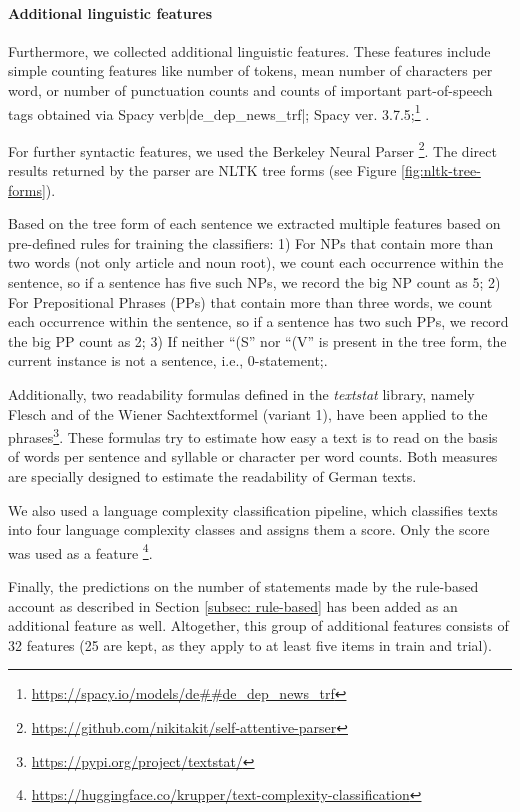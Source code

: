 \documentclass[11pt]{article}
\begin{document}
\paragraph{Additional linguistic features}

Furthermore, we collected additional linguistic features. These features include simple counting features like number of tokens, mean number of characters per word, or number of punctuation counts and counts of important part-of-speech tags obtained via Spacy verb|de\_dep\_news\_trf|; Spacy ver. 3.7.5;\footnote{\url{https://spacy.io/models/de##de_dep_news_trf}} \citet{honnibal2020spacy}. 

For further syntactic features, we used the Berkeley Neural Parser \citep{kitaev-etal-2019-multilingual,kitaev-klein-2018-constituency}\footnote{\url{https://github.com/nikitakit/self-attentive-parser}}. The direct results returned by the parser are NLTK tree forms (see Figure \ref{fig:nltk-tree-forms}).

Based on the tree form of each sentence we extracted multiple features based on pre-defined rules for training the classifiers: 1) For NPs that contain more than two words (not only article and noun root), we count each occurrence within the sentence, so if a sentence has five such NPs, we record the big NP count as 5; 2) For Prepositional Phrases (PPs) that contain more than three words, we count each occurrence within the sentence, so if a sentence has two such PPs, we record the big PP count as 2; 3) If neither ``(S'' nor ``(V'' is present in the tree form, the current instance is not a sentence, i.e., 0-statement;.

Additionally, two readability formulas defined in the \textit{textstat} library, namely Flesch and of the Wiener Sachtextformel (variant 1), have been applied to the phrases\footnote{\url{https://pypi.org/project/textstat/}}. These formulas try to estimate how easy a text is to read on the basis of words per sentence and syllable or character per word counts. Both measures are specially designed to estimate the readability of German texts.

We also used a language complexity classification pipeline, which classifies texts into four language complexity classes and assigns them a score. Only the score was used as a feature \footnote{\url{https://huggingface.co/krupper/text-complexity-classification}}.

Finally, the predictions on the number of statements made by the rule-based account as described in Section \ref{subsec: rule-based} has been added as an additional feature as well. Altogether, this group of additional features consists of 32 features (25 are kept, as they apply to at least five items in train and trial).%
\end{document}
